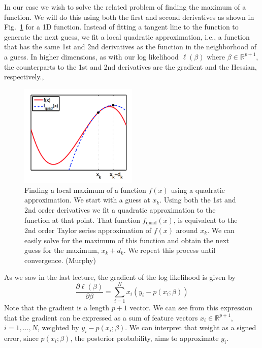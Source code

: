 \documentclass[a4paper]{article}
\begin{document}
In our case we wish to solve the related problem of finding the maximum of a function.  We will do this using both the first and second derivatives as shown in Fig.\ \ref{fig:newton2} for a 1D function.  Instead of fitting a tangent line to the function to generate the next guess, we fit a local quadratic approximation, i.e., a function that has the same 1st and 2nd derivatives as the function in the neighborhood of a guess.  In higher dimensions, as with our log likelihood $\ell(\beta)$ where $\beta\in\mathbb{R}^{p+1}$, the counterparts to the 1st and 2nd derivatives are the gradient and the Hessian, respectively.,

\begin{figure}
\centering
\includegraphics[width=0.5\textwidth]{newton_noncvx.png}
\caption{Finding a local maximum of a function $f(x)$ using a quadratic approximation.  We start with a guess at $x_k$.  Using both the 1st and 2nd order derivatives we fit a quadratic approximation to the function at that point.  That function $f_{\text{quad}}(x)$, is equivalent to the 2nd order Taylor series approximation of $f(x)$ around $x_k$.  We can easily solve for the maximum of this function and obtain the next guess for the maximum, $x_k+d_k$. We repeat this process until convergence. (Murphy)}
\label{fig:newton2}
\end{figure}

As we saw in the last lecture, the gradient of the log likelihood is given by
\begin{equation}
\frac{\partial \ell(\beta)}{\partial \beta} = \sum_{i=1}^N x_i (y_i - p(x_i;\beta))
\label{eqn:llgrad}
	\end{equation}
Note that the gradient is a length $p+1$ vector.  We can see from this expression that the gradient can be expressed as a sum of feature vectors $x_i\in\mathbb{R}^{p+1}$, $i=1,\ldots,N$, weighted by $y_i-p(x_i;\beta)$.  We can interpret that weight as a signed error, since $p(x_i;\beta)$, the posterior probability, aims to approximate $y_i$.
\end{document}
